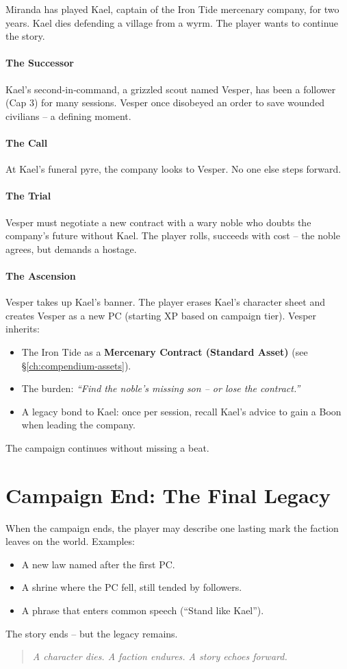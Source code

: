 Miranda has played Kael, captain of the Iron Tide mercenary company, for two years. Kael dies defending a village from a wyrm. The player wants to continue the story.

\paragraph{The Successor}
Kael’s second‑in‑command, a grizzled scout named Vesper, has been a follower (Cap 3) for many sessions. Vesper once disobeyed an order to save wounded civilians – a defining moment.

\paragraph{The Call}
At Kael’s funeral pyre, the company looks to Vesper. No one else steps forward.

\paragraph{The Trial}
Vesper must negotiate a new contract with a wary noble who doubts the company’s future without Kael. The player rolls, succeeds with cost – the noble agrees, but demands a hostage.

\paragraph{The Ascension}
Vesper takes up Kael’s banner. The player erases Kael’s character sheet and creates Vesper as a new PC (starting XP based on campaign tier). Vesper inherits:
\begin{itemize}
  \item The Iron Tide as a \textbf{Mercenary Contract (Standard Asset)} (see \S\ref{ch:compendium-assets}).
  \item The burden: \textit{“Find the noble’s missing son – or lose the contract.”}
  \item A legacy bond to Kael: once per session, recall Kael’s advice to gain a Boon when leading the company.
\end{itemize}
The campaign continues without missing a beat.

\section{Campaign End: The Final Legacy}
\label{sec:final-legacy}

When the campaign ends, the player may describe one lasting mark the faction leaves on the world. Examples:
\begin{itemize}
  \item A new law named after the first PC.
  \item A shrine where the PC fell, still tended by followers.
  \item A phrase that enters common speech (“Stand like Kael”).
\end{itemize}
The story ends – but the legacy remains.

\begin{quote}
\emph{A character dies. A faction endures. A story echoes forward.}
\end{quote}